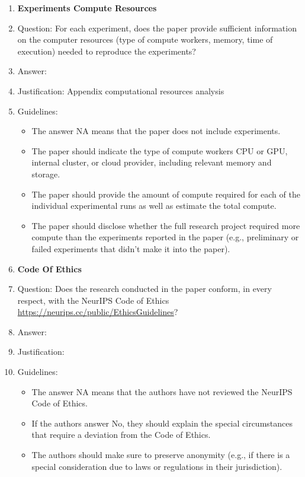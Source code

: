 \documentclass{article}
\begin{document}
\begin{enumerate}
\item {\bf Experiments Compute Resources}
    \item[] Question: For each experiment, does the paper provide sufficient information on the computer resources (type of compute workers, memory, time of execution) needed to reproduce the experiments?
    \item[] Answer: \answerYes{} %
    \item[] Justification: Appendix computational resources analysis
    \item[] Guidelines:
    \begin{itemize}
        \item The answer NA means that the paper does not include experiments.
        \item The paper should indicate the type of compute workers CPU or GPU, internal cluster, or cloud provider, including relevant memory and storage.
        \item The paper should provide the amount of compute required for each of the individual experimental runs as well as estimate the total compute. 
        \item The paper should disclose whether the full research project required more compute than the experiments reported in the paper (e.g., preliminary or failed experiments that didn't make it into the paper). 
    \end{itemize}
    
\item {\bf Code Of Ethics}
    \item[] Question: Does the research conducted in the paper conform, in every respect, with the NeurIPS Code of Ethics \url{https://neurips.cc/public/EthicsGuidelines}?
    \item[] Answer: \answerYes{} %
    \item[] Justification: 
    \item[] Guidelines:
    \begin{itemize}
        \item The answer NA means that the authors have not reviewed the NeurIPS Code of Ethics.
        \item If the authors answer No, they should explain the special circumstances that require a deviation from the Code of Ethics.
        \item The authors should make sure to preserve anonymity (e.g., if there is a special consideration due to laws or regulations in their jurisdiction).
    \end{itemize}



\end{enumerate}
\end{document}
